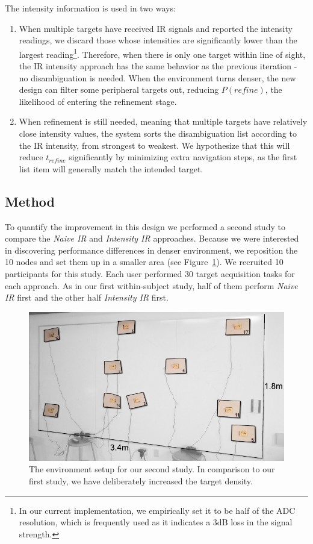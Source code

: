 The intensity information is used in two ways:
\begin{enumerate}
\item When multiple targets have received IR signals and reported the intensity readings, we discard those whose intensities are significantly lower than the largest reading\footnote{In our current implementation, we empirically set it to be half of the ADC resolution, which is frequently used as it indicates a 3dB loss in the signal strength.}. Therefore, when there is only one target within line of sight, the IR intensity approach has the same behavior as the previous iteration - no disambiguation is needed. When the environment turns denser, the new design can filter some peripheral targets out, reducing $P(refine)$, the likelihood of entering the refinement stage.
\item When refinement is still needed, meaning that multiple targets have relatively close intensity values, the system sorts the disambiguation list according to the IR intensity, from strongest to weakest. We hypothesize that this will reduce $t_{refine}$ significantly by minimizing extra navigation steps, as the first list item will generally match the intended target.
\end{enumerate}

\subsection{Method}
To quantify the improvement in this design we performed a second study to compare the {\em Naive IR} and {\em Intensity IR} approaches. Because we were interested in discovering performance differences in denser environment, we reposition the 10 nodes and set them up in a smaller area (see Figure~\ref{fig:study-layout2}). We recruited 10 participants for this study. Each  user performed 30 target acquisition tasks for each approach. As in our first within-subject study, half of them perform {\em Naive IR} first and the other half {\em Intensity IR} first.

\begin{figure}[t]
\centering
\includegraphics[width=1.0\columnwidth]{figures/study-layout2.pdf}
\caption{The environment setup for our second study. In comparison to our first study, we have deliberately increased the target density.}
\label{fig:study-layout2}
\end{figure}


